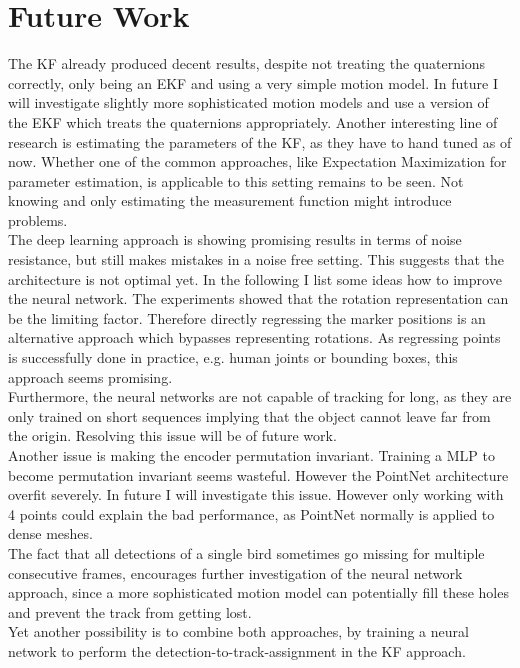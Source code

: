 \documentclass{article}
\begin{document}
\section{Future Work}
\label{future_work}

The KF already produced decent results, despite not treating the quaternions correctly, only being an EKF and using a very simple motion model. In future I will investigate slightly more sophisticated motion models and use a version of the EKF which treats the quaternions appropriately. Another interesting line of research is estimating the parameters of the KF, as they have to hand tuned as of now. Whether one of the common approaches, like Expectation Maximization for parameter estimation, is applicable to this setting remains to be seen. Not knowing and only estimating the measurement function might introduce problems. \\
The deep learning approach is showing promising results in terms of noise resistance, but still makes mistakes in a noise free setting. This suggests that the architecture is not optimal yet. In the following I list some ideas how to improve the neural network. The experiments showed that the rotation representation can be the limiting factor. Therefore directly regressing the marker positions is an alternative approach which bypasses representing rotations. As regressing points is successfully done in practice, e.g. human joints or bounding boxes, this approach seems promising. \\
Furthermore, the neural networks are not capable of tracking for long, as they are only trained on short sequences implying that the object cannot leave far from the origin. Resolving this issue will be of future work. \\
Another issue is making the encoder permutation invariant. Training a MLP to become permutation invariant seems wasteful. However the PointNet architecture overfit severely. In future I will investigate this issue. However only working with 4 points could explain the bad performance, as PointNet normally is applied to dense meshes.\\
The fact that all detections of a single bird sometimes go missing for multiple consecutive frames, encourages further investigation of the neural network approach, since a more sophisticated motion model can potentially fill these holes and prevent the track from getting lost. \\
Yet another possibility is to combine both approaches, by training a neural network to perform the detection-to-track-assignment in the KF approach.
\end{document}
